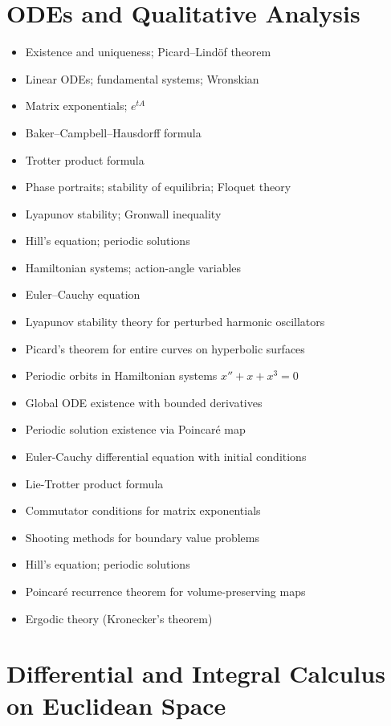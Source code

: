 \documentclass{amsart}
\begin{document}
\section{ODEs and Qualitative Analysis}

\begin{itemize}
  \item Existence and uniqueness; Picard--Lind\"of theorem
  \item Linear ODEs; fundamental systems; Wronskian
  \item Matrix exponentials; $e^{tA}$
  \item Baker--Campbell--Hausdorff formula
  \item Trotter product formula
  \item Phase portraits; stability of equilibria; Floquet theory
  \item Lyapunov stability; Gronwall inequality
  \item Hill's equation; periodic solutions
  \item Hamiltonian systems; action-angle variables
  \item Euler--Cauchy equation
  \item Lyapunov stability theory for perturbed harmonic oscillators
  \item Picard's theorem for entire curves on hyperbolic surfaces
  \item Periodic orbits in Hamiltonian systems $x'' + x + x^3 = 0$
  \item Global ODE existence with bounded derivatives
  \item Periodic solution existence via Poincar\'e map
  \item Euler-Cauchy differential equation with initial conditions
  \item Lie-Trotter product formula
  \item Commutator conditions for matrix exponentials
  \item Shooting methods for boundary value problems
  \item Hill's equation; periodic solutions
  \item Poincar\'e recurrence theorem for volume-preserving maps
  \item Ergodic theory (Kronecker's theorem)
\end{itemize}

\section{Differential and Integral Calculus on Euclidean Space}
\end{document}
